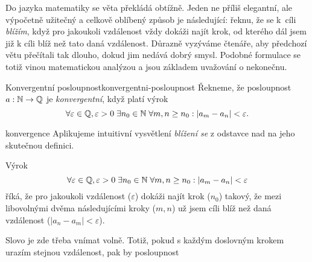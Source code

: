 Do jazyka matematiky se věta  překládá
obtížně. Jeden ne příliš elegantní, ale výpočetně užitečný a celkově oblíbený
způsob je následující: řeknu, že se k~cíli \emph{blížím}, když pro jakoukoli
vzdálenost vždy dokáži najít krok, od kterého dál jsem již k cíli blíž než tato
daná vzdálenost. Důrazně vyzýváme čtenáře, aby předchozí větu přečítali tak
dlouho, dokud jim nedává dobrý smysl. Podobné formulace se totiž vinou
matematickou analýzou a jsou základem uvažování o nekonečnu.

\begin{definition}{Konvergentní posloupnost}{konvergentni-posloupnost}
 Řekneme, že posloupnost $a:\mathbb{N} \to \mathbb{Q}$ je \emph{konvergentní}, když platí výrok
 \[
  \forall \varepsilon \in \mathbb{Q}, \varepsilon>0 \; \exists n_0 \in \mathbb{N} \; \forall m,n
  \geq n_0: |a_m - a_n| < \varepsilon.
 \]
\end{definition}

\begin{remark}{}{konvergence}
 Aplikujeme intuitivní vysvětlení \emph{blížení se} z odstavce nad
  na jeho skutečnou definici.

 Výrok
 \[
  \forall \varepsilon \in \mathbb{Q}, \varepsilon>0 \; \exists n_0 \in \mathbb{N} \; \forall m,n
  \geq n_0: |a_m - a_n| < \varepsilon
 \]
 říká, že pro jakoukoli vzdálenost ($\varepsilon$) dokáži najít krok ($n_0$)
 takový, že mezi libovolnými dvěma následujícími kroky ($m,n$) už jsem cíli blíž
 než daná vzdálenost ($|a_n -a_m|<\varepsilon$).

 Slovo  je zde třeba vnímat volně. Totiž, pokud s každým doslovným
 krokem urazím stejnou vzdálenost, pak by posloupnost 
\end{remark}

